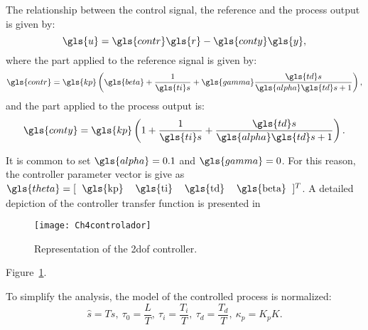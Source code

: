 %
The relationship between the control signal, the reference and the process output is given by:
%
\begin{equation}  %
\gls{u} = \gls{contr} \gls{r} - \gls{conty} \gls{y},
\label{us}
\end{equation}
%
where the part applied to the reference signal is given by:
%
\begin{equation}  %
\gls{contr}=  \gls{kp}\left({\gls{beta} + \frac{1}{\gls{ti} s}+ \gls{gamma} \frac{\gls{td} s}{\gls{alpha} \gls{td} s +1}}\right),
\label{eq:cr}
\end{equation}
%
and the part applied to the process output is:
%
\begin{equation}  %
\gls{conty}=  \gls{kp}\left({1 + \frac{1}{\gls{ti} s}+\frac{\gls{td} s}{\gls{alpha} \gls{td} s +1} }\right).
\label{eq:cy}
\end{equation}

It is common to set $\gls{alpha}=0.1$ and $\gls{gamma}=0$. For this reason, the controller parameter vector is give as $\gls{theta}=[\begin{tabular}{cccc} \gls{kp} & \gls{ti} & \gls{td} &\gls{beta} \end{tabular}]^T$. A detailed depiction of the controller transfer function is presented in 
\begin{figure}[tb]
	\centering
	\texttt{[image: Ch4controlador]}
	\caption{Representation of the \gls{2dof} controller.}
	\label{fig:Ch4controlador}
\end{figure}
%
Figure~\ref{fig:Ch4controlador}.

To simplify the analysis, the model of the controlled process is normalized:
%
\begin{equation*}
\hat{s}= Ts, \ \tau_0=  \displaystyle\frac{L}{T}, \ \tau_i=  \displaystyle\frac{T_i}{T}, \ \tau_d = \frac{T_d}{T}, \ \kappa_p= K_p K.
\end{equation*}  %

